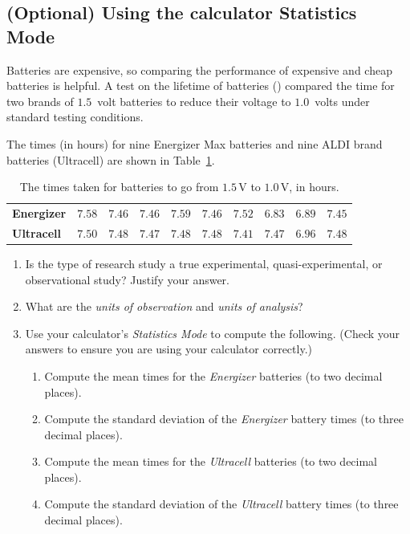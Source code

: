 \documentclass[
  11pt,
  a4paper,
  krantz2]{krantz}
\providecommand{\tightlist}{%
  \setlength{\itemsep}{0pt}\setlength{\parskip}{0pt}}
\newlength{\greyboxheight}
\newcommand{\setgreyboxheight}[1]{%
  \setlength{\greyboxheight}{2.3\baselineskip * #1}%
}
\newenvironment{greybox}[1]{%
  \nopagebreak
  \setgreyboxheight{#1}%
  \begin{tcolorbox}[
    colframe=gray!30!black,
    boxrule=2pt,
    width=\linewidth,
    height=\greyboxheight,
    valign=center,
    colback=white,
    left=4pt,
    right=4pt, 
    top=4pt, 
    bottom=4pt,
    before skip=4pt,
    after skip=4pt
  ]
\vspace*{\greyboxheight} %
}{%
  \end{tcolorbox}
  \goodbreak
}
\newcommand{\answerbox}[1]{\noindent\begin{greybox}{#1}\end{greybox}}
\begin{document}
\subsection{\texorpdfstring{\textbf{(Optional)} Using the calculator Statistics Mode}{(Optional) Using the calculator Statistics Mode}}\label{CalculatorBatteries}

Batteries are expensive, so comparing the performance of expensive and cheap batteries is helpful.
A test on the lifetime of batteries () compared the time for two brands of \(1.5\)~volt batteries to reduce their voltage to \(1.0\)~volts under standard testing conditions.

The times (in hours) for nine Energizer Max batteries and nine ALDI brand batteries (Ultracell) are shown in Table~\ref{tab:BattTable}.

\begin{table}
\centering
\caption{\label{tab:BattTable}The times taken for batteries to go from $1.5\,\text{V}$ to $1.0\,\text{V}$, in hours.}
\centering
\fontsize{10}{12}\selectfont
\begin{tabular}[t]{>{}llllllllll}
\toprule
\textbf{Energizer} & $7.58$ & $7.46$ & $7.46$ & $7.59$ & $7.46$ & $7.52$ & $6.83$ & $6.89$ & $7.45$\\
\textbf{Ultracell} & $7.50$ & $7.48$ & $7.47$ & $7.48$ & $7.48$ & $7.41$ & $7.47$ & $6.96$ & $7.48$\\
\bottomrule
\end{tabular}
\end{table}

\begin{enumerate}
\def\labelenumi{\arabic{enumi}.}
\tightlist
\item
  Is the type of research study a true experimental, quasi-experimental, or observational study? Justify your answer.
  \tightlist
  \answerbox{2}
\item
  What are the \emph{units of observation} and \emph{units of analysis}?
  \answerbox{2}
\item
  Use your calculator's \emph{Statistics Mode} to compute the following. (Check your answers to ensure you are using your calculator correctly.)

  \begin{enumerate}
  \def\labelenumii{\alph{enumii}.}
  \item
    Compute the mean times for the \emph{Energizer} batteries (to two decimal places).
  \item
    Compute the standard deviation of the \emph{Energizer} battery times (to three decimal places).
  \item
    Compute the mean times for the \emph{Ultracell} batteries (to two decimal places).
  \item
    Compute the standard deviation of the \emph{Ultracell} battery times (to three decimal places).
  \end{enumerate}
\end{enumerate}
\end{document}
